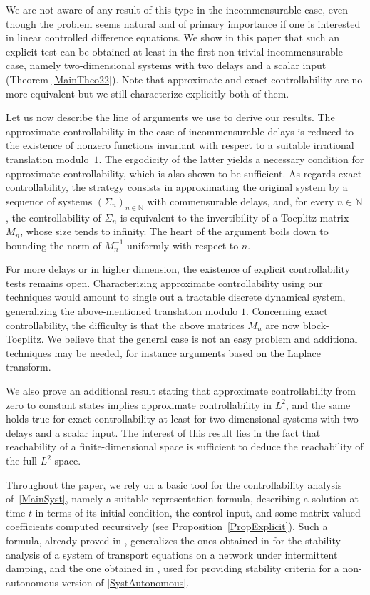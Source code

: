 We are not aware of any result of this type in the incommensurable case, even though the problem seems natural and of primary importance if one is interested in linear controlled difference equations. We show in this paper that such an explicit test can be obtained at least in the first non-trivial incommensurable case, namely two-dimensional systems with two delays and a scalar input (Theorem \ref{MainTheo22}). Note that approximate and exact controllability are no more equivalent but we still characterize explicitly both of them.

Let us now describe the line of arguments we use to derive our results. The approx\-imate controllability in the case of incommensurable delays is reduced to the existence of nonzero functions invariant with respect to a suitable irrational translation modulo~$1$. The ergodicity of the latter yields a necessary condition for approximate controllability, which is also shown to be sufficient. As regards exact controllability, the strategy consists in approximating the original system by a sequence of systems $(\Sigma_n)_{n \in \mathbb N}$ with commensurable delays, and, for every $n \in \mathbb N$, the controllability of $\Sigma_n$ is equivalent to the invertibility of a Toeplitz matrix $M_n$, whose size tends to infinity. The heart of the argument boils down to bounding the norm of $M_n^{-1}$ uniformly with respect to $n$.

For more delays or in higher dimension, the existence of explicit controllability tests remains open. Characterizing approximate controllability using our techniques would amount to single out a tractable discrete dynamical system, generalizing the above-mentioned translation modulo $1$. Concerning exact controllability, the difficulty is that the above matrices $M_n$ are now block-Toeplitz. We believe that the general case is not an easy problem and additional techniques may be needed, for instance arguments based on the Laplace transform.

We also prove an additional result stating that approximate controllability from zero to constant states implies approximate controllability in $L^2$, and the same holds true for exact controllability at least for two-dimensional systems with two delays and a scalar input. The interest of this result lies in the fact that reachability of a finite-dimensional space is sufficient to deduce the reachability of the full $L^2$ space.

Throughout the paper, we rely on a basic tool for the controllability analysis of~\eqref{MainSyst}, namely a suitable representation formula, describing a solution at time $t$ in terms of its initial condition, the control input, and some matrix-valued coefficients computed recursively (see Proposition~\ref{PropExplicit}). Such a formula, already proved in \cite{Mazanti2017Relative}, generalizes the ones obtained in \cite[Th.\,3.3 \& 3.6]{Chitour2017Persistently} for the stability analysis of a system of transport equations on a network under intermittent damping, and the one obtained in \cite[Prop.\,3.14]{Chitour2016Stability}, used for providing stability criteria for a non-autonomous version of \eqref{SystAutonomous}.

